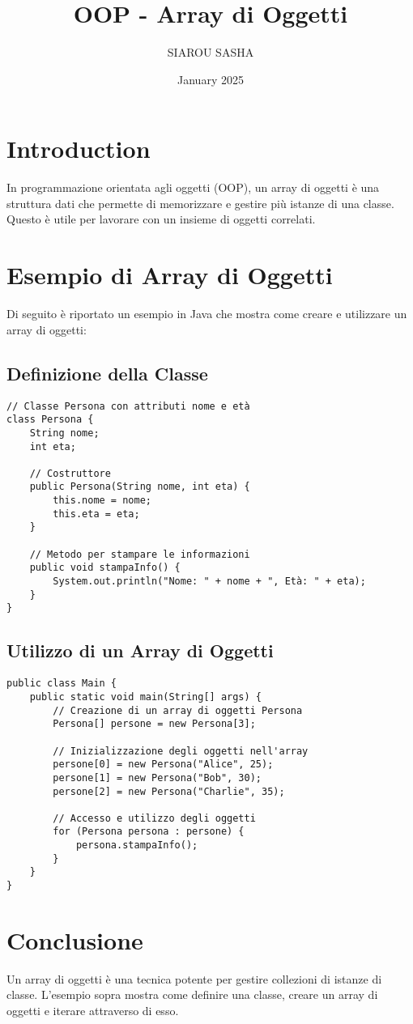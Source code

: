 \documentclass{article}
\title{OOP - Array di Oggetti}
\author{SIAROU SASHA}
\date{January 2025}
\begin{document}
\maketitle

\section{Introduction}
In programmazione orientata agli oggetti (OOP), un array di oggetti è una struttura dati che permette di memorizzare e gestire più istanze di una classe. Questo è utile per lavorare con un insieme di oggetti correlati.

\section{Esempio di Array di Oggetti}
Di seguito è riportato un esempio in Java che mostra come creare e utilizzare un array di oggetti:

\subsection{Definizione della Classe}
\begin{lstlisting}
// Classe Persona con attributi nome e età
class Persona {
    String nome;
    int eta;

    // Costruttore
    public Persona(String nome, int eta) {
        this.nome = nome;
        this.eta = eta;
    }

    // Metodo per stampare le informazioni
    public void stampaInfo() {
        System.out.println("Nome: " + nome + ", Età: " + eta);
    }
}
\end{lstlisting}



\subsection{Utilizzo di un Array di Oggetti}
\begin{lstlisting}
public class Main {
    public static void main(String[] args) {
        // Creazione di un array di oggetti Persona
        Persona[] persone = new Persona[3];

        // Inizializzazione degli oggetti nell'array
        persone[0] = new Persona("Alice", 25);
        persone[1] = new Persona("Bob", 30);
        persone[2] = new Persona("Charlie", 35);

        // Accesso e utilizzo degli oggetti
        for (Persona persona : persone) {
            persona.stampaInfo();
        }
    }
}
\end{lstlisting}

\section{Conclusione}
Un array di oggetti è una tecnica potente per gestire collezioni di istanze di classe. L'esempio sopra mostra come definire una classe, creare un array di oggetti e iterare attraverso di esso.
\end{document}
